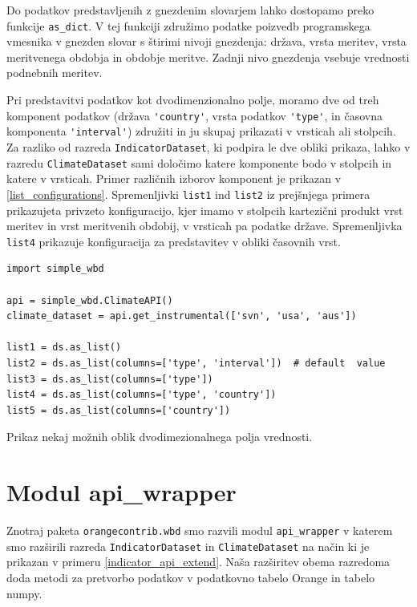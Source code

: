Do podatkov predstavljenih z gnezdenim slovarjem lahko dostopamo preko funkcije
\verb|as_dict|. V tej funkciji združimo podatke poizvedb programskega
vmesnika v gnezden slovar s štirimi nivoji gnezdenja: država, vrsta meritev,
vrsta meritvenega obdobja in obdobje meritve. Zadnji nivo gnezdenja vsebuje
vrednosti podnebnih meritev.

Pri predstavitvi podatkov kot dvodimenzionalno polje, moramo dve od treh
komponent podatkov (država \verb|'country'|, vrsta podatkov \verb|'type'|, 
in časovna komponenta \verb|'interval'|)
združiti in ju skupaj prikazati v vrsticah ali stolpcih. Za razliko od razreda
\verb|IndicatorDataset|, ki podpira le dve obliki prikaza, lahko v razredu
\verb|ClimateDataset| sami določimo katere komponente bodo v stolpcih in
katere v vrsticah. Primer različnih izborov komponent je prikazan v
\ref{list_configurations}. Spremenljivki \verb|list1| ind \verb|list2| iz
prejšnjega primera prikazujeta privzeto konfiguracijo, kjer imamo v stolpcih
kartezični produkt vrst meritev in vrst meritvenih obdobij, v vrsticah pa
podatke države. Spremenljivka \verb|list4| prikazuje konfiguracija za
predstavitev v obliki časovnih vrst.

\begin{snippet}
\begin{center}
\begin{lstlisting}
import simple_wbd

api = simple_wbd.ClimateAPI()                   
climate_dataset = api.get_instrumental(['svn', 'usa', 'aus'])

list1 = ds.as_list()
list2 = ds.as_list(columns=['type', 'interval'])  # default  value
list3 = ds.as_list(columns=['type'])
list4 = ds.as_list(columns=['type', 'country']) 
list5 = ds.as_list(columns=['country'])
\end{lstlisting}
\end{center}
\cprotect
\caption{Prikaz nekaj možnih oblik dvodimezionalnega polja vrednosti.} 
\label{list_configurations}
\end{snippet} 



\section{Modul api\_wrapper}


Znotraj paketa \verb|orangecontrib.wbd| smo razvili modul \verb|api_wrapper| v
katerem smo razširili razreda \verb|IndicatorDataset| in \verb|ClimateDataset|
na način ki je prikazan v primeru \ref{indicator_api_extend}. Naša
razširitev obema razredoma doda metodi za pretvorbo podatkov v podatkovno 
tabelo Orange in tabelo numpy.

